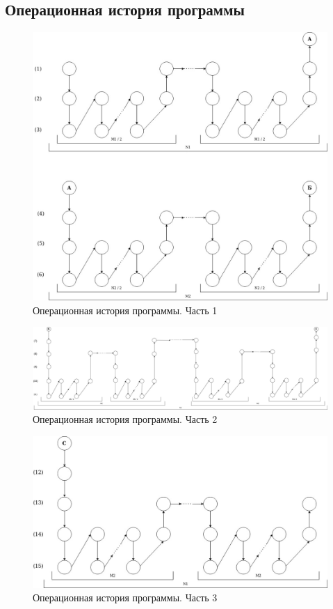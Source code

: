 \documentclass[a4paper, 12pt]{article}
\begin{document}
\clearpage
\newpage
\subsection{Операционная история программы}
\begin{figure}[h!]
	\centering
	\includegraphics[scale=0.3]{oper_history_1}
	\caption{Операционная история программы. Часть 1}
\end{figure}
\begin{figure}[h!]
	\centering
	\includegraphics[scale=0.3]{oper_history_2}
	\caption{Операционная история программы. Часть 2}
\end{figure}
\clearpage
\newpage
\begin{figure}[h!]
	\centering
	\includegraphics[scale=0.4]{oper_history_3}
	\caption{Операционная история программы. Часть 3}
\end{figure}
\clearpage
\newpage
\end{document}
